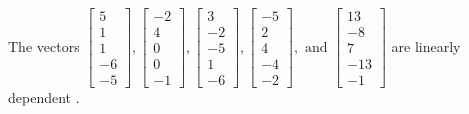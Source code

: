 \begin{exercise}
\begin{exerciseStatement}
  \end{exerciseStatement}
  \begin{exerciseAnswer}
   The vectors \(\left[\begin{array}{r}
5 \\
1 \\
1 \\
-6 \\
-5
\end{array}\right] , \left[\begin{array}{r}
-2 \\
4 \\
0 \\
0 \\
-1
\end{array}\right] , \left[\begin{array}{r}
3 \\
-2 \\
-5 \\
1 \\
-6
\end{array}\right] , \left[\begin{array}{r}
-5 \\
2 \\
4 \\
-4 \\
-2
\end{array}\right] , \text{ and } \left[\begin{array}{r}
13 \\
-8 \\
7 \\
-13 \\
-1
\end{array}\right]\) are 
  	 linearly dependent  .
  


  \end{exerciseAnswer}
\end{exercise}